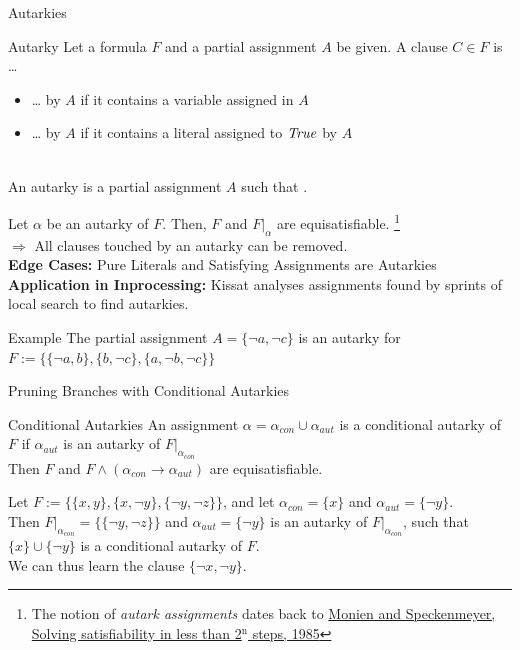 \documentclass[t]{sdqbeamer}
\begin{document}
\begin{frame}{Autarkies}
\vspace*{-2ex}
\begin{block}{Autarky}
    Let a formula $F$ and a partial assignment $A$ be given. A clause $C \in F$ is \dots \\[1ex]
    \begin{itemize}\setlength{\itemsep}{1ex}
        \item \dots {} by $A$ if it contains a variable assigned in $A$
        \item \dots {} by $A$ if it contains a literal assigned to $\mathit{True}$ by $A$
    \end{itemize}~\\[-1ex]
    An autarky is a partial assignment $A$ such that .
\end{block}
%
Let $\alpha$ be an autarky of $F$. Then, $F$ and $F|_\alpha$ are equisatisfiable.%
\footnote{The notion of \emph{autark assignments} dates back to \href{https://doi.org/10.1016/0166-218X(85)90050-2}{Monien and Speckenmeyer, Solving satisfiability in less than 2\({}^{\mbox{n}}\) steps, 1985}}\\[3pt]
$\Rightarrow$ All clauses touched by an autarky can be removed.\\[1em]
%
\textbf{Edge Cases:} Pure Literals and Satisfying Assignments are Autarkies\\[1ex]
\textbf{Application in Inprocessing:} Kissat analyses assignments found by sprints of local search to find autarkies.\\[1em]
%
\begin{exampleblock}{Example}
    The partial assignment $A = \{ \lnot a, \lnot c \}$ is an autarky for $F := \bigl\{\{ \lnot a, b \}, \{ b, \lnot c \}, \{ a, \lnot b, \lnot c \}\bigr\}$
\end{exampleblock}
\end{frame}


\begin{frame}{Pruning Branches with Conditional Autarkies}
\begin{block}{Conditional Autarkies}
An assignment $\alpha = \alpha_{con} \cup \alpha_{aut}$ is a conditional autarky of $F$ if $\alpha_{aut}$ is an autarky of $F|_{\alpha_{con}}$\\[1ex]
Then $F$ and $F \land (\alpha_{con} \rightarrow \alpha_{aut})$ are equisatisfiable.\\[1ex]
\end{block}
\begin{example}
Let $F := \bigl\{\{x, y\}, \{x, \lnot y\}, \{\lnot y, \lnot z\}\bigr\}$, and let $\alpha_{con} = \{x\}$ and $\alpha_{aut} = \{\lnot y\}$.\\[1ex]
Then $F|_{\alpha_{con}} = \bigl\{\{\lnot y, \lnot z\}\bigr\}$ and $\alpha_{aut} = \{\lnot y\}$ is an autarky of $F|_{\alpha_{con}}$, such that $\{x\} \cup \{\lnot y\}$ is a conditional autarky of $F$.\\[1ex]
We can thus learn the clause $\{\lnot x, \lnot y\}$.
\end{example}
\end{frame}
\end{document}
